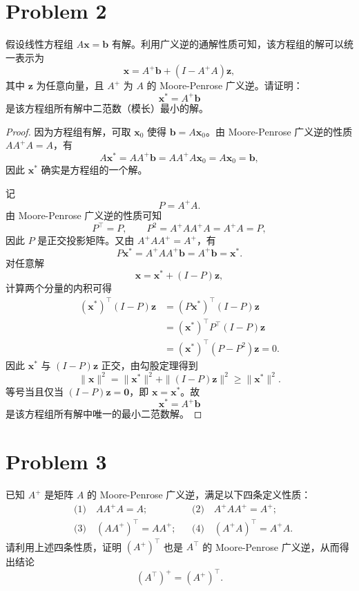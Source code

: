 \section*{Problem 2}

假设线性方程组 $A\bm{x} = \bm{b}$ 有解。利用广义逆的通解性质可知，该方程组的解可以统一表示为
\[
    \bm{x} = A^+\bm{b} + \left(I - A^+A\right)\bm{z},
\]
其中 $\bm{z}$ 为任意向量，且 $A^+$ 为 $A$ 的 Moore-Penrose 广义逆。请证明：
\[
    \bm{x}^* = A^+\bm{b}
\]
是该方程组所有解中二范数（模长）最小的解。

\begin{proof}
    因为方程组有解，可取 $\bm{x}_0$ 使得 $\bm{b} = A\bm{x}_0$。由 Moore-Penrose 广义逆的性质 $AA^+A = A$，有
    \[
        A\bm{x}^*
        = AA^+\bm{b}
        = AA^+A\bm{x}_0
        = A\bm{x}_0
        = \bm{b},
    \]
    因此 $\bm{x}^*$ 确实是方程组的一个解。

    记
    \[
        P = A^+A.
    \]
    由 Moore-Penrose 广义逆的性质可知
    \[
        P^\top = P, \qquad
        P^2 = A^+AA^+A = A^+A = P,
    \]
    因此 $P$ 是正交投影矩阵。又由 $A^+AA^+ = A^+$，有
    \[
        P\bm{x}^*
        = A^+AA^+\bm{b}
        = A^+\bm{b}
        = \bm{x}^*.
    \]
    对任意解
    \[
        \bm{x} = \bm{x}^* + (I - P)\bm{z},
    \]
    计算两个分量的内积可得
    \[
        \begin{aligned}
            \left(\bm{x}^*\right)^\top(I - P)\bm{z}
            &= \left(P\bm{x}^*\right)^\top(I - P)\bm{z} \\
            &= \left(\bm{x}^*\right)^\top P^\top(I - P)\bm{z} \\
            &= \left(\bm{x}^*\right)^\top\left(P - P^2\right)\bm{z}
             = 0.
        \end{aligned}
    \]
    因此 $\bm{x}^*$ 与 $(I - P)\bm{z}$ 正交，由勾股定理得到
    \[
        \|\bm{x}\|^2
        = \|\bm{x}^*\|^2 + \|(I - P)\bm{z}\|^2
        \ge \|\bm{x}^*\|^2.
    \]
    等号当且仅当 $(I - P)\bm{z} = \bm{0}$，即 $\bm{x} = \bm{x}^*$。故
    \[
        \boxed{\bm{x}^* = A^+\bm{b}}
    \]
    是该方程组所有解中唯一的最小二范数解。
\end{proof}

\section*{Problem 3}

已知 $A^+$ 是矩阵 $A$ 的 Moore-Penrose 广义逆，满足以下四条定义性质：
\[
    \begin{aligned}
        &\text{(1)}\quad AA^+A = A; &
        &\text{(2)}\quad A^+AA^+ = A^+; \\
        &\text{(3)}\quad \left(AA^+\right)^\top = AA^+; &
        &\text{(4)}\quad \left(A^+A\right)^\top = A^+A.
    \end{aligned}
\]
请利用上述四条性质，证明 $\left(A^+\right)^\top$ 也是 $A^\top$ 的 Moore-Penrose 广义逆，从而得出结论
\[
    \left(A^\top\right)^+ = \left(A^+\right)^\top.
\]

